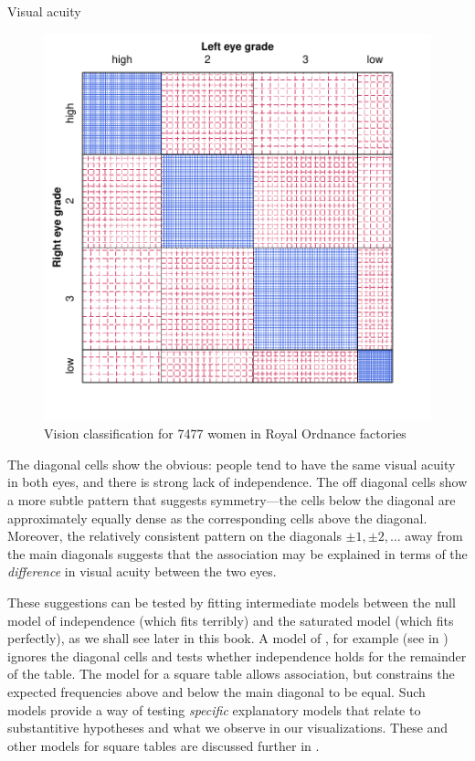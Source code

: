 \documentclass[11pt]{book}
\renewenvironment{knitrout}{\small\renewcommand{\baselinestretch}{.85}}{} %
\begin{document}
\begin{Example}[vision1]{Visual acuity}
\begin{knitrout}
\begin{figure}[!htbp]
\centerline{\includegraphics[width=.7\textwidth]{ch04/fig/VA-sieve2} }

\caption[Vision classification for 7477 women in Royal Ordnance factories]{Vision classification for 7477 women in Royal Ordnance factories\label{fig:VA-sieve2}}
\end{figure}


\end{knitrout}

The diagonal cells show the obvious:
people tend to have the same visual acuity in both eyes, and there is
strong lack of independence.  The off diagonal cells show a more subtle
pattern that suggests symmetry---the cells below the diagonal
are approximately equally dense as the corresponding cells above the diagonal.
Moreover, the relatively consistent pattern on the diagonals
$\pm 1, \pm 2, \dots$ away from the main diagonals suggests
that the association may be explained in terms of the \emph{difference}
in visual acuity between the two eyes.

These suggestions can be tested by fitting  intermediate models
between the null model of independence (which fits terribly)
and the saturated model (which fits perfectly),
as we shall see later in this book.
A model of , for example 
(see  in )
ignores the diagonal cells and tests whether independence holds
for the remainder of the table.  
The  model for a square table allows association,
but constrains the expected frequencies above and below the
main diagonal to be equal.
Such models provide a
way of testing \emph{specific} explanatory models that relate to
substantitive hypotheses and what we observe in our visualizations.
These and other models for square tables
are discussed further in .
\end{Example}
\end{document}

